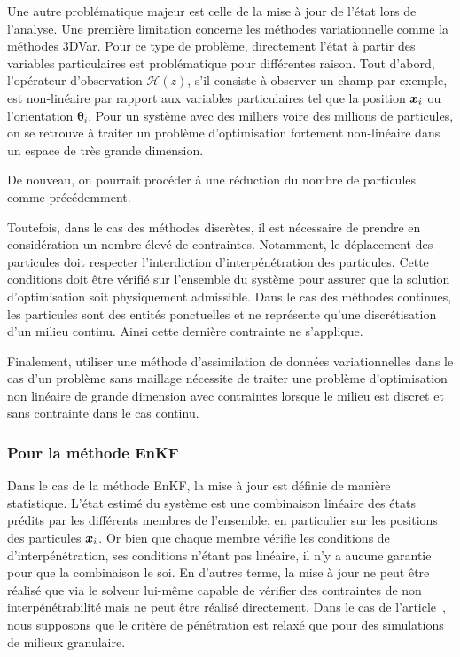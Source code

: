 Une autre problématique majeur est celle de la mise à jour de l'état lors de l'analyse.
Une première limitation concerne les méthodes variationnelle comme la méthodes 3DVar. Pour ce type de problème, directement l'état à partir des variables particulaires est problématique pour différentes raison. Tout d'abord, l'opérateur d'observation $\mathcal H(z)$, s'il consiste à observer un champ par exemple, est non-linéaire par rapport aux variables particulaires tel que la position $\bm{x}_i$ ou l'orientation $\bm \theta_i$. Pour un système avec des milliers voire des millions de particules, on se retrouve à traiter un problème d'optimisation fortement non-linéaire dans un espace de très grande dimension.

De nouveau, on pourrait procéder à une réduction du nombre de particules comme précédemment.

Toutefois, dans le cas des méthodes discrètes, il est nécessaire de prendre en considération un nombre élevé de contraintes. Notamment, le déplacement des particules doit respecter l'interdiction d'interpénétration des particules. Cette conditions doit être vérifié sur l'ensemble du système pour assurer que la solution d'optimisation soit physiquement admissible. Dans le cas des méthodes continues, les particules sont des entités ponctuelles et ne représente qu'une discrétisation d'un milieu continu. Ainsi cette dernière contrainte ne s'applique.

Finalement, utiliser une méthode d'assimilation de données variationnelles dans le cas d'un problème sans maillage nécessite de traiter une problème d'optimisation non linéaire de grande dimension avec contraintes lorsque le milieu est discret et sans contrainte dans le cas continu.

\subsubsection{Pour la méthode EnKF}

Dans le cas de la méthode EnKF, la mise à jour est définie de manière statistique. L'état estimé du système est une combinaison linéaire des états prédits par les différents membres de l'ensemble, en particulier sur les positions des particules $\bm{x}_i$. Or bien que chaque membre vérifie les conditions de d'interpénétration, ses conditions n'étant pas linéaire, il n'y a aucune garantie pour que la combinaison le soi.
En d'autres terme, la mise à jour ne peut être réalisé que via le solveur lui-même capable de vérifier des contraintes de non interpénétrabilité mais ne peut être réalisé directement. Dans le cas de l'article~\cite{chen_superfloe_2022}, nous supposons que le critère de pénétration est relaxé que pour des simulations de milieux granulaire.

